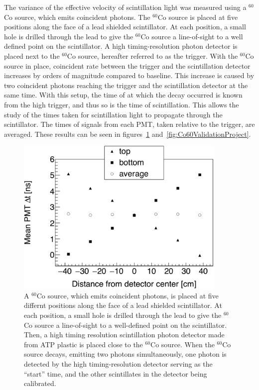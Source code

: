 The variance of the effective velocity of scintillation light was measured using a $^{60}$Co source, which emits coincident photons.
The $^{60}$Co source is placed at five positions along the face of a lead shielded scintillator.
At each position, a small hole is drilled through the lead to give the $^{60}$Co source a line-of-sight to a well defined point on the scintillator.
A high timing-resolution photon detector is placed next to the $^{60}$Co source, hereafter referred to as the trigger.
With the $^{60}$Co source in place, coincident rate between the trigger and the scintillation detector increases by orders of magnitude compared to baseline.
This increase is caused by two coincident photons reaching the trigger and the scintillation detector at the same time.
With this setup, the time of at which the decay occurred is known from the high trigger, and thus so is the time of scintillation.
This allows the study of the times taken for scintillation light to propagate through the scintillator.
The times of signals from each PMT, taken relative to the trigger, are averaged.
These results can be seen in figures~\ref{fig:ConstPMTAvg} and~\ref{fig:Co60ValidationProject}.
\begin{figure}[]
    \centering
    \includegraphics[width = 0.9\textwidth]{Content/Methods/ConstPMTAvg.png}
    \caption{A $^{60}$Co source, which emits coincident photons, is placed at five differnt positions along the face of a lead shielded scintillator.
    At each position, a small hole is drilled through the lead to give the $^{60}$Co source a line-of-sight to a well-defined point on the scintillator.
    Then, a high timing resolution scintillation photon detector made from ATP plastic is placed close to the $^{60}$Co source.
    When the $^{60}$Co source decays, emitting two photons simultaneously, one photon is detected by the high timing-resolution detector serving as the ``start'' time, and the other scintillates in the detector being calibrated.}
    \label{fig:ConstPMTAvg}
\end{figure}
